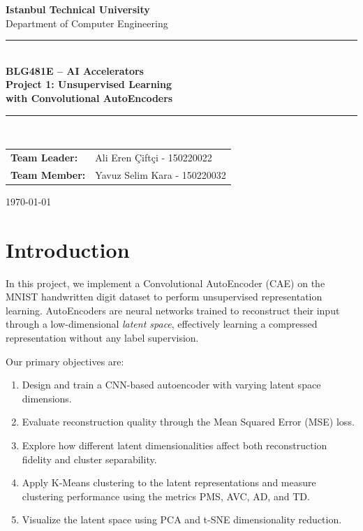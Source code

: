 \documentclass[12pt,a4paper]{article}
\begin{document}
\begin{titlepage}
  \centering
  \vspace*{1.5cm}
  {\LARGE \textbf{Istanbul Technical University}\\[0.3em]
  \large Department of Computer Engineering}\\[1.5cm]

  \rule{\linewidth}{1pt}\\[0.8em]
  {\huge \textbf{BLG481E – AI Accelerators}}\\[0.6em]
  {\LARGE \textbf{Project 1: Unsupervised Learning}}\\[0.3em]
  {\LARGE \textbf{with Convolutional AutoEncoders}}\\[0.8em]
  \rule{\linewidth}{1pt}\\[2cm]

  \begin{tabular}{ll}
    \textbf{Team Leader:} & Ali Eren Çiftçi - 150220022 \\[0.5em]
    \textbf{Team Member:} & Yavuz Selim Kara - 150220032 \\[0.5em]
  \end{tabular}

  \vfill
  {\large \today}
\end{titlepage}

\tableofcontents
\newpage

\section{Introduction}

In this project, we implement a Convolutional AutoEncoder (CAE) on the MNIST handwritten digit dataset to perform unsupervised representation learning. AutoEncoders are neural networks trained to reconstruct their input through a low-dimensional \emph{latent space}, effectively learning a compressed representation without any label supervision.

Our primary objectives are:
\begin{enumerate}
  \item Design and train a CNN-based autoencoder with varying latent space dimensions.
  \item Evaluate reconstruction quality through the Mean Squared Error (MSE) loss.
  \item Explore how different latent dimensionalities affect both reconstruction fidelity and cluster separability.
  \item Apply K-Means clustering to the latent representations and measure clustering performance using the metrics PMS, AVC, AD, and TD.
  \item Visualize the latent space using PCA and t-SNE dimensionality reduction.
\end{enumerate}
\end{document}
